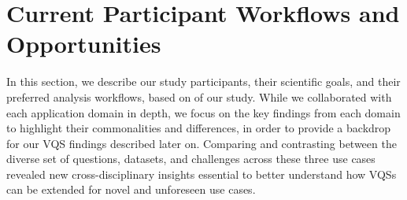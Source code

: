  \section{Current Participant Workflows and Opportunities\label{sec:participantdatasets}}
 In this section, we describe our study participants, their scientific goals, and their preferred analysis workflows, based on  of our study. %
 While we collaborated with each application domain in depth, we focus on the key findings from each domain to highlight their commonalities and differences, in order to provide a backdrop for our VQS findings described later on. Comparing and contrasting between the diverse set of questions, datasets, and challenges across these three use cases revealed new cross-disciplinary insights essential to better understand how VQSs can be extended for novel and unforeseen use cases.
